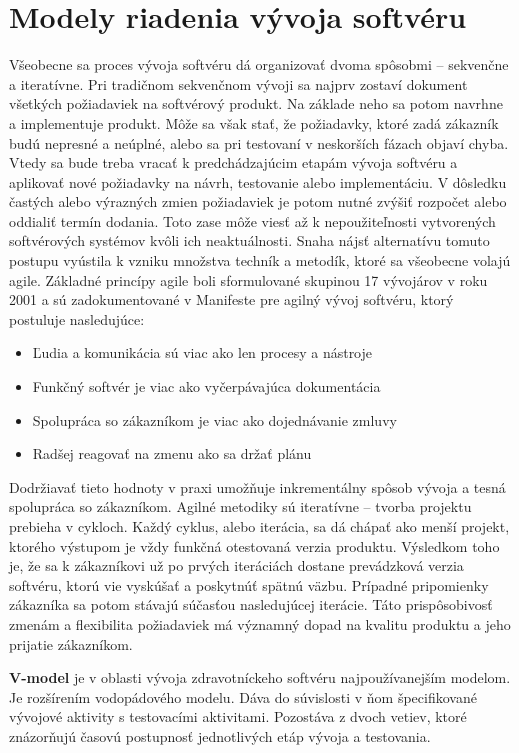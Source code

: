 \documentclass[10pt,twoside,slovak,a4paper]{article}
\begin{document}
\section{Modely riadenia vývoja softvéru}%
Všeobecne sa proces vývoja softvéru dá organizovať dvoma spôsobmi – sekvenčne a iteratívne. Pri tradičnom sekvenčnom vývoji sa najprv zostaví dokument všetkých požiadaviek na softvérový produkt. Na základe neho sa potom navrhne a implementuje produkt. Môže sa však stať, že požiadavky, ktoré zadá zákazník budú nepresné a neúplné, alebo sa pri testovaní v neskorších fázach objaví chyba. Vtedy sa bude treba vracať k predchádzajúcim etapám vývoja softvéru a aplikovať nové požiadavky na návrh, testovanie alebo implementáciu. V dôsledku častých alebo výrazných zmien požiadaviek je potom nutné zvýšiť rozpočet alebo oddialiť termín dodania. Toto zase môže viesť až k nepoužiteľnosti vytvorených softvérových systémov kvôli ich neaktuálnosti. Snaha nájsť alternatívu tomuto postupu vyústila k vzniku množstva techník a metodík, ktoré sa všeobecne volajú agile. Základné princípy agile boli sformulované skupinou 17 vývojárov v roku 2001 a sú zadokumentované v Manifeste pre agilný vývoj softvéru\cite{agileManifesto}, ktorý postuluje nasledujúce: 
\begin{itemize}
\item Ľudia a komunikácia sú viac ako len procesy a nástroje
\item Funkčný softvér je viac ako vyčerpávajúca dokumentácia
\item Spolupráca so zákazníkom je viac ako dojednávanie zmluvy
\item Radšej reagovať na zmenu ako sa držať plánu
\end{itemize}
Dodržiavať tieto hodnoty v praxi umožňuje inkrementálny spôsob vývoja a tesná spolupráca so zákazníkom. Agilné metodiky sú iteratívne – tvorba projektu prebieha v cykloch. Každý cyklus, alebo iterácia, sa dá chápať ako menší projekt, ktorého výstupom je vždy funkčná otestovaná verzia produktu. Výsledkom toho je, že sa k zákazníkovi už po prvých iteráciách dostane prevádzková verzia softvéru, ktorú vie vyskúšať a poskytnúť spätnú väzbu. Prípadné pripomienky zákazníka sa potom stávajú súčasťou nasledujúcej iterácie. Táto prispôsobivosť zmenám a flexibilita požiadaviek má významný dopad na kvalitu produktu a jeho prijatie zákazníkom. 

\textbf{V-model} je v oblasti vývoja zdravotníckeho softvéru najpoužívanejším modelom. Je rozšírením vodopádového modelu. Dáva do súvislosti v ňom špecifikované vývojové aktivity s testovacími aktivitami. Pozostáva z dvoch vetiev, ktoré znázorňujú časovú postupnosť jednotlivých etáp vývoja a testovania.
\end{document}
